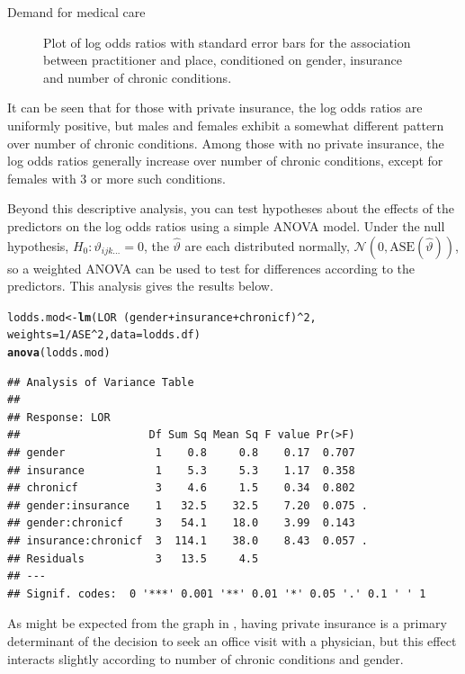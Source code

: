 \documentclass[11pt]{book}\usepackage[]{graphicx}\usepackage[]{color}
\makeatletter
\newcommand{\hlnum}[1]{\textcolor[rgb]{0.686,0.059,0.569}{#1}}%
\newcommand{\hlopt}[1]{\textcolor[rgb]{0,0,0}{#1}}%
\newcommand{\hlstd}[1]{\textcolor[rgb]{0.345,0.345,0.345}{#1}}%
\newcommand{\hlkwb}[1]{\textcolor[rgb]{0.69,0.353,0.396}{#1}}%
\newcommand{\hlkwc}[1]{\textcolor[rgb]{0.333,0.667,0.333}{#1}}%
\newcommand{\hlkwd}[1]{\textcolor[rgb]{0.737,0.353,0.396}{\textbf{#1}}}%
\newenvironment{kframe}{%
 \def\at@end@of@kframe{}%
 \ifinner\ifhmode%
  \def\at@end@of@kframe{\end{minipage}}%
  \begin{minipage}{\columnwidth}%
 \fi\fi%
 \def\FrameCommand##1{\hskip\@totalleftmargin \hskip-\fboxsep
 \colorbox{shadecolor}{##1}\hskip-\fboxsep
     \hskip-\linewidth \hskip-\@totalleftmargin \hskip\columnwidth}%
 \MakeFramed {\advance\hsize-\width
   \@totalleftmargin\z@ \linewidth\hsize
   \@setminipage}}%
 {\par\unskip\endMakeFramed%
 \at@end@of@kframe}
\newenvironment{knitrout}{}{} %
\renewenvironment{knitrout}{\small\renewcommand{\baselinestretch}{.85}}{} %
\makeatother
\begin{document}
\begin{Example}[nmes4]{Demand for medical care}
\begin{knitrout}
\begin{figure}[!htbp]
\caption[Plot of log odds ratios with standard error bars for the association between practitioner and place, conditioned on gender, insurance and number of chronic conditions]{Plot of log odds ratios with standard error bars for the association between practitioner and place, conditioned on gender, insurance and number of chronic conditions.\label{fig:nmes4-loddsratio}}
\end{figure}


\end{knitrout}
\noindent It can be seen that for those with private insurance, the log odds ratios are uniformly positive, but
males and females exhibit a somewhat different pattern over number of chronic conditions.
Among those with no private insurance, the log odds ratios generally increase over number of chronic conditions,
except for females with 3 or more such conditions.

Beyond this descriptive analysis, you can test hypotheses about the effects of the predictors on the log odds
ratios using a simple ANOVA model.   
Under the null hypothesis, $H_0 : \vartheta_{ijk\dots} = 0$, the 
$\widehat{\vartheta}$ are each distributed normally, $\mathcal{N} (0, \mathrm{ASE}(\widehat{\vartheta}))$,
so a weighted ANOVA can be used to test for differences according to the predictors.
This analysis gives the results below.
\begin{knitrout}
\color{fgcolor}\begin{kframe}
\begin{alltt}
\hlstd{lodds.mod} \hlkwb{<-} \hlkwd{lm}\hlstd{(LOR} \hlopt{~} \hlstd{(gender} \hlopt{+} \hlstd{insurance} \hlopt{+} \hlstd{chronicf)}\hlopt{^}\hlnum{2}\hlstd{,}
                \hlkwc{weights}\hlstd{=}\hlnum{1}\hlopt{/}\hlstd{ASE}\hlopt{^}\hlnum{2}\hlstd{,} \hlkwc{data}\hlstd{=lodds.df)}
\hlkwd{anova}\hlstd{(lodds.mod)}
\end{alltt}
\begin{verbatim}
## Analysis of Variance Table
## 
## Response: LOR
##                    Df Sum Sq Mean Sq F value Pr(>F)  
## gender              1    0.8     0.8    0.17  0.707  
## insurance           1    5.3     5.3    1.17  0.358  
## chronicf            3    4.6     1.5    0.34  0.802  
## gender:insurance    1   32.5    32.5    7.20  0.075 .
## gender:chronicf     3   54.1    18.0    3.99  0.143  
## insurance:chronicf  3  114.1    38.0    8.43  0.057 .
## Residuals           3   13.5     4.5                 
## ---
## Signif. codes:  0 '***' 0.001 '**' 0.01 '*' 0.05 '.' 0.1 ' ' 1
\end{verbatim}
\end{kframe}
\end{knitrout}
As might be expected from the graph in , having private insurance
is a primary determinant of the decision to seek an office visit with a physician, but this
effect interacts slightly according to number of chronic conditions and gender.

\end{Example}
\end{document}
